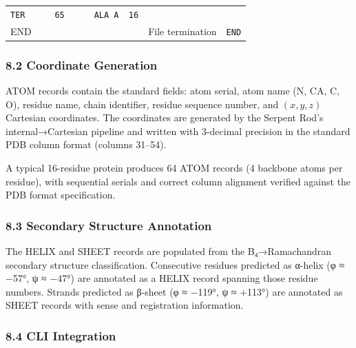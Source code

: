 \documentclass[12pt,a4paper]{article}
\begin{document}
\begin{longtable}[]{@{}lll@{}}
\begin{minipage}[t]{0.32\columnwidth}
\texttt{TER\ \ \ \ \ \ 65\ \ \ \ \ \ ALA\ A\ \ 16}\strut
\end{minipage}\tabularnewline
\begin{minipage}[t]{0.28\columnwidth}\raggedright
END\strut
\end{minipage} & \begin{minipage}[t]{0.32\columnwidth}\raggedright
File termination\strut
\end{minipage} & \begin{minipage}[t]{0.32\columnwidth}\raggedright
\texttt{END}\strut
\end{minipage}\tabularnewline
\bottomrule
\end{longtable}

\hypertarget{coordinate-generation}{%
\subsubsection{8.2 Coordinate Generation}\label{coordinate-generation}}

ATOM records contain the standard fields: atom serial, atom name (N, CA,
C, O), residue name, chain identifier, residue sequence number, and
\((x, y, z)\) Cartesian coordinates. The coordinates are generated by
the Serpent Rod's internal→Cartesian pipeline and written with 3-decimal
precision in the standard PDB column format (columns 31--54).

A typical 16-residue protein produces 64 ATOM records (4 backbone atoms
per residue), with sequential serials and correct column alignment
verified against the PDB format specification.

\hypertarget{secondary-structure-annotation}{%
\subsubsection{8.3 Secondary Structure
Annotation}\label{secondary-structure-annotation}}

The HELIX and SHEET records are populated from the B₄→Ramachandran
secondary structure classification. Consecutive residues predicted as
α-helix (φ ≈ −57°, ψ ≈ −47°) are annotated as a HELIX record spanning
those residue numbers. Strands predicted as β-sheet (φ ≈ −119°, ψ ≈
+113°) are annotated as SHEET records with sense and registration
information.

\hypertarget{cli-integration}{%
\subsubsection{8.4 CLI Integration}\label{cli-integration}}
\end{document}

